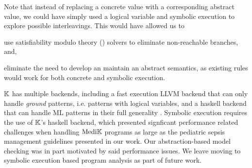 Note that instead of replacing a concrete value with a corresponding abstract value,
we could have simply used a logical variable and symbolic execution to explore
possible interleavings. This would have allowed us to
\begin{enumerate*}
  \item use satisfiability modulo theory (\SMT{}) solvers to eliminate
  non-reachable branches, and,
  \item eliminate the need to develop an maintain an abstract semantics, as
  existing rules would work for both concrete and symbolic execution.
\end{enumerate*}

$\mathbb{K}$ has multiple backends, including a fast execution LLVM backend
that can only handle \emph{ground} patterns, i.e. patterns with logical
variables, and a haskell backend that can handle ML patterns in their
full generality \cite{KFrameworkBackendsUrl}. Symbolic execution requires the use of $\mathbb{K}$'s haskell
backend, which presented signficant performance related challenges when
handling $\text{Medi}\mathbb{K}{}{}$ programs as large as the pediatric sepsis management
guidelines presented in our work. Our abstraction-based model checking was in part motivated by
said performance issues. We leave moving to symbolic execution based
program analysis as part of future work.







%
%

